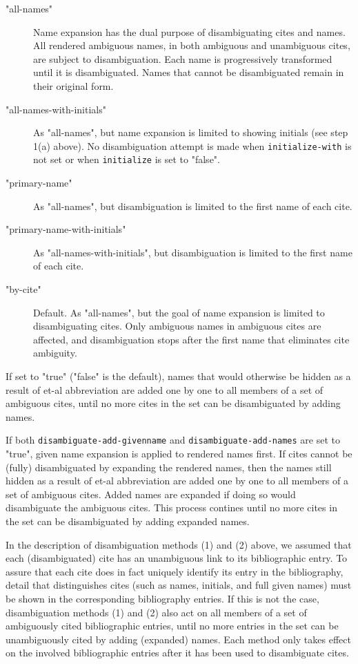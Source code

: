 \begin{description}
\begin{description}
\begin{description}
\item["all-names"]
Name expansion has the dual purpose of disambiguating cites and names.
All rendered ambiguous names, in both ambiguous and unambiguous cites,
are subject to disambiguation. Each name is progressively transformed
until it is disambiguated. Names that cannot be disambiguated remain in
their original form.
\item["all-names-with-initials"]
As "all-names", but name expansion is limited to showing initials (see
step 1(a) above). No disambiguation attempt is made when
\texttt{initialize-with} is not set or when \texttt{initialize} is set
to "false".
\item["primary-name"]
As "all-names", but disambiguation is limited to the first name of each
cite.
\item["primary-name-with-initials"]
As "all-names-with-initials", but disambiguation is limited to the first
name of each cite.
\item["by-cite"]
Default. As "all-names", but the goal of name expansion is limited to
disambiguating cites. Only ambiguous names in ambiguous cites are
affected, and disambiguation stops after the first name that eliminates
cite ambiguity.
\end{description}
\end{description}
\item[\texttt{disambiguate-add-names} {[}Method (2){]}]
If set to "true" ("false" is the default), names that would otherwise be
hidden as a result of et-al abbreviation are added one by one to all
members of a set of ambiguous cites, until no more cites in the set can
be disambiguated by adding names.
\end{description}

If both \texttt{disambiguate-add-givenname} and
\texttt{disambiguate-add-names} are set to "true", given name expansion
is applied to rendered names first. If cites cannot be (fully)
disambiguated by expanding the rendered names, then the names still
hidden as a result of et-al abbreviation are added one by one to all
members of a set of ambiguous cites. Added names are expanded if doing
so would disambiguate the ambiguous cites. This process contines until
no more cites in the set can be disambiguated by adding expanded names.

In the description of disambiguation methods (1) and (2) above, we
assumed that each (disambiguated) cite has an unambiguous link to its
bibliographic entry. To assure that each cite does in fact uniquely
identify its entry in the bibliography, detail that distinguishes cites
(such as names, initials, and full given names) must be shown in the
corresponding bibliography entries. If this is not the case,
disambiguation methods (1) and (2) also act on all members of a set of
ambiguously cited bibliographic entries, until no more entries in the
set can be unambiguously cited by adding (expanded) names. Each method
only takes effect on the involved bibliographic entries after it has
been used to disambiguate cites.

